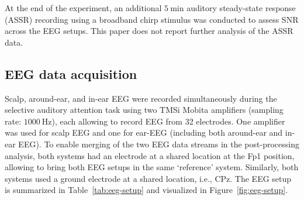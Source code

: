 \documentclass[fleqn,10pt]{wlscirep}
\begin{document}
	At the end of the experiment, an additional $\SI{5}{\minute}$ auditory steady-state response (ASSR) recording using a broadband chirp stimulus was conducted to assess SNR across the EEG setups. This paper does not report further analysis of the ASSR data.
	
	\subsection*{EEG data acquisition}
	Scalp, around-ear, and in-ear EEG were recorded simultaneously during the selective auditory attention task using two TMSi Mobita amplifiers (sampling rate: $\SI{1000}{\hertz}$), each allowing to record EEG from 32 electrodes. One amplifier was used for scalp EEG and one for ear-EEG (including both around-ear and in-ear EEG). To enable merging of the two EEG data streams in the post-processing analysis, both systems had an electrode at a shared location at the Fp1 position, allowing to bring both EEG setups in the same `reference' system. Similarly, both systems used a ground electrode at a shared location, i.e., CPz. The EEG setup is summarized in Table~\ref{tab:eeg-setup} and visualized in Figure~\ref{fig:eeg-setup}.
	
\end{document}
